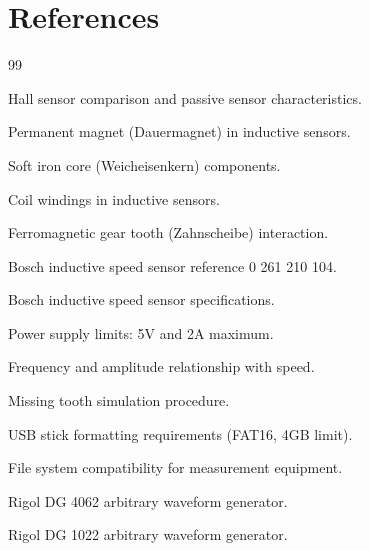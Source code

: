 \documentclass[a4paper,12pt]{article}
\begin{document}
\newpage

\section*{References}

\begin{thebibliography}{99}

 Hall sensor comparison and passive sensor characteristics.

 Permanent magnet (Dauermagnet) in inductive sensors.

 Soft iron core (Weicheisenkern) components.

 Coil windings in inductive sensors.

 Ferromagnetic gear tooth (Zahnscheibe) interaction.

 Bosch inductive speed sensor reference 0 261 210 104.

 Bosch inductive speed sensor specifications.

 Power supply limits: 5V and 2A maximum.

 Frequency and amplitude relationship with speed.

 Missing tooth simulation procedure.

 USB stick formatting requirements (FAT16, 4GB limit).

 File system compatibility for measurement equipment.

 Rigol DG 4062 arbitrary waveform generator.

 Rigol DG 1022 arbitrary waveform generator.

\end{thebibliography}
\end{document}
